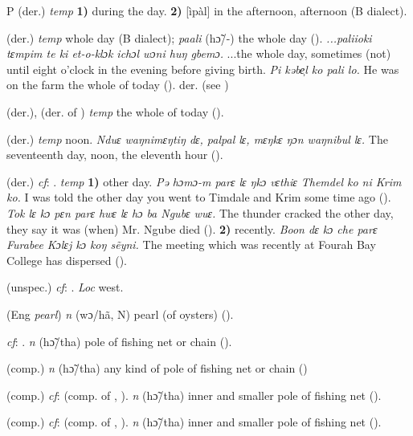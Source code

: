 \begin{letter}{P}
 (der.) \textit{temp} \textbf{1)} during the day. \textbf{2)} [ìpàl] in the afternoon, afternoon (B dialect). 

 (der.) \textit{temp} whole day (B dialect); \textit{paali} (hɔ̃/-) the whole day (\citealt{Pichl1967}). \textit{...paliioki tɛmpim te ki et-o-klɔk ichɔl wɔni huŋ gbemɔ.} ...the whole day, sometimes (not) until eight o'clock in the evening before giving birth. \textit{Pi kəbe̹l ko pali lo.} He was on the farm the whole of today (\citealt{Pichl1967}). der.  (see ) 

 (der.), (der. of ) \textit{temp} the whole of today (\citealt{Pichl1967}). 

 (der.) \textit{temp} noon. \textit{Nduɛ waŋnimɛŋtiŋ dɛ, palpal lɛ, mɛŋkɛ ŋɔn waŋnibul lɛ.} The seventeenth day, noon, the eleventh hour (\citealt{Pichl1967}).

 (der.) \textit{cf}: . \textit{temp} \textbf{1)} other day. \textit{Pə hɔmɔ-m parɛ lɛ ŋkɔ vɛthiɛ Themdel ko ni Krim ko.} I was told the other day you went to Timdale and Krim some time ago (\citealt{Pichl1967}). \textit{Tok lɛ kɔ pɛn parɛ hwɛ lɛ hɔ ba Ngubɛ wuɛ.} The thunder cracked the other day, they say it was (when) Mr. Ngube died (\citealt{Pichl1967}). \textbf{2)} recently. \textit{Boon dɛ kɔ che parɛ Furabee Kɔlɛj kɔ koŋ sẽyni.} The meeting which was recently at Fourah Bay College has dispersed (\citealt{Pichl1967}). 

 (unspec.) \textit{cf}: . \textit{Loc} west.

 (Eng \textit{pearl}) \textit{n} (wɔ/hã, N) pearl (of oysters) (\citealt{Pichl1967}).

 \textit{cf}: . \textit{n} (hɔ̃/tha) pole of fishing net or chain (\citealt{Pichl1967}).

 (comp.) \textit{n} (hɔ̃/tha) any kind of pole of fishing net or chain (\citealt{Pichl1967})

 (comp.) \textit{cf}:  (comp. of , ). \textit{n} (hɔ̃/tha) inner and smaller pole of fishing net (\citealt{Pichl1967}).

 (comp.) \textit{cf}:  (comp. of , ). \textit{n} (hɔ̃/tha) inner and smaller pole of fishing net (\citealt{Pichl1967}).


\end{letter}

